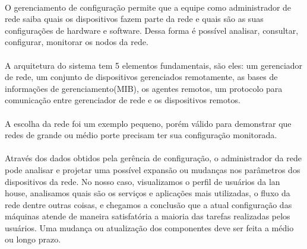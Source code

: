 \documentclass[a4paper]{article}
\begin{document}
\paragraph{}O gerenciamento de configuração permite que a equipe como administrador de rede saiba quais os dispositivos fazem parte da rede e quais são as suas configurações de hardware e software. Dessa forma é possível analisar, consultar, configurar, monitorar os nodos da rede.

\paragraph{}A arquitetura do sistema tem 5 elementos fundamentais, são eles: um gerenciador de rede, um conjunto de dispositivos gerenciados remotamente, as bases de informações de gerenciamento(MIB), os agentes remotos, um protocolo para comunicação entre gerenciador de rede e os dispositivos remotos.
\paragraph{}A escolha da rede foi um exemplo pequeno, porém válido para demonstrar que redes de grande ou médio porte precisam ter sua configuração monitorada.

\paragraph{}Através dos dados obtidos pela gerência de configuração, o administrador da rede pode analisar e projetar uma possível expansão ou mudanças nos parâmetros dos dispositivos da rede.  No nosso caso, visualizamos o perfil de usuários da lan house, analisamos quais são os serviços e aplicações mais utilizadas, o fluxo da rede dentre outras coisas, e chegamos a conclusão que a atual configuração das máquinas atende de maneira satisfatória a maioria das tarefas realizadas pelos usuários. Uma mudança ou atualização dos componentes deve ser feita a médio ou longo prazo. 
    
    
\end{document}
